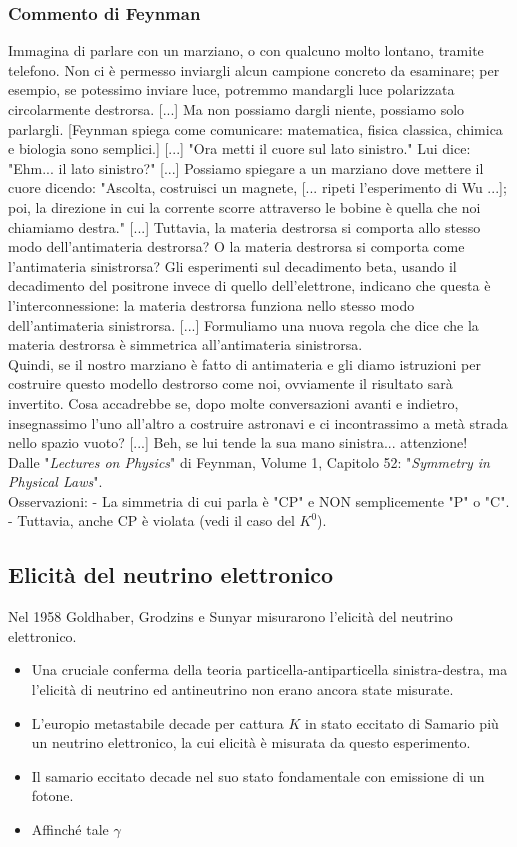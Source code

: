 \subsubsection{Commento di Feynman}
Immagina di parlare con un marziano, o con qualcuno molto lontano, tramite telefono. Non ci è permesso inviargli alcun campione concreto da esaminare; per esempio, se potessimo inviare luce, potremmo mandargli luce polarizzata circolarmente destrorsa. [...] Ma non possiamo dargli niente, possiamo solo parlargli.  
[Feynman spiega come comunicare: matematica, fisica classica, chimica e biologia sono semplici.]  
[...] "Ora metti il cuore sul lato sinistro." Lui dice: "Ehm... il lato sinistro?" [...] Possiamo spiegare a un marziano dove mettere il cuore dicendo: "Ascolta, costruisci un magnete, [... ripeti l'esperimento di Wu ...]; poi, la direzione in cui la corrente scorre attraverso le bobine è quella che noi chiamiamo destra."  
[...] Tuttavia, la materia destrorsa si comporta allo stesso modo dell'antimateria destrorsa? O la materia destrorsa si comporta come l'antimateria sinistrorsa? Gli esperimenti sul decadimento beta, usando il decadimento del positrone invece di quello dell'elettrone, indicano che questa è l'interconnessione: la materia destrorsa funziona nello stesso modo dell'antimateria sinistrorsa.  
[...] Formuliamo una nuova regola che dice che la materia destrorsa è simmetrica all'antimateria sinistrorsa. \\ 
Quindi, se il nostro marziano è fatto di antimateria e gli diamo istruzioni per costruire questo modello destrorso come noi, ovviamente il risultato sarà invertito. Cosa accadrebbe se, dopo molte conversazioni avanti e indietro, insegnassimo l'uno all'altro a costruire astronavi e ci incontrassimo a metà strada nello spazio vuoto? [...]  
Beh, se lui tende la sua mano sinistra... attenzione!  \\
Dalle "\textit{Lectures on Physics}" di Feynman, Volume 1, Capitolo 52: "\textit{Symmetry in Physical Laws}".\\ 

Osservazioni:
- La simmetria di cui parla è "CP" e NON semplicemente "P" o "C".  
- Tuttavia, anche CP è violata (vedi il caso del \(K^0\)).
\subsection{Elicità del neutrino elettronico}
Nel 1958 Goldhaber, Grodzins e Sunyar misurarono l'elicità del neutrino elettronico.
\begin{itemize}
    \item Una cruciale conferma della teoria particella-antiparticella sinistra-destra, ma l'elicità di neutrino ed antineutrino non erano ancora state misurate.
    \item L'europio metastabile decade per cattura $K$ in stato eccitato di Samario più un neutrino elettronico, la cui elicità è misurata da questo esperimento.
    \item Il samario eccitato decade nel suo stato fondamentale con emissione di un fotone.
    \item Affinché tale $\gamma$ 
\end{itemize}
